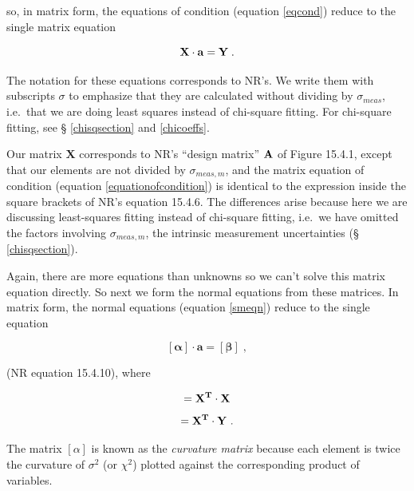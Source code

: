 \documentclass[psfig,preprint]{aastex}
\begin{document}
\noindent so, in matrix form, the equations of condition (equation
\ref{eqcond}) reduce to the single matrix equation

\begin{equation}
\label{equationofcondition}
{\bf X \cdot a} = {\bf Y} \; .
\end{equation}

\noindent The notation for these equations corresponds to NR's. We write
them with subscripts $\sigma$ to emphasize that they are calculated
without dividing by $\sigma_{meas}$, i.e.\ that we are doing least
squares instead of chi-square fitting. For chi-square fitting, see \S
\ref{chisqsection} and \ref{chicoeffs}.

	Our matrix $\mathbf{X}$ corresponds to NR's ``design
matrix'' $\bf A$ of Figure 15.4.1, except that our elements are not
divided by $\sigma_{meas,m}$, and the matrix equation of condition
(equation \ref{equationofcondition}) is identical to the expression
inside the square brackets of NR's equation 15.4.6. The differences
arise because here we are discussing least-squares fitting instead of
chi-square fitting, i.e.\ we have omitted the factors involving
$\sigma_{meas,m}$, the intrinsic measurement uncertainties (\S
\ref{chisqsection}).

	Again, there are more equations than unknowns so we can't solve
this matrix equation directly.  So next we form the normal equations
from these matrices.  In matrix form, the normal equations (equation
\ref{smeqn}) reduce to the single equation 

\begin{equation} \label{matrixnormal}
\mathbf{[\alpha] \cdot a} = \mathbf{[\beta]} \; ,
\end{equation}

\noindent (NR equation 15.4.10), where

\begin{mathletters} 
\label{ssdef}
\begin{equation} 
[\alpha] = {\bf X^T \cdot X} 
\end{equation}
\begin{equation}
[\beta] = {\bf X^T \cdot Y} \ .
\end{equation}
\end{mathletters}

\noindent The matrix $[\alpha]$ is known as the {\it curvature
matrix} because each element is twice the curvature of $\sigma^2$ (or
$\chi^2$) plotted against the corresponding product of variables. 
\end{document}
